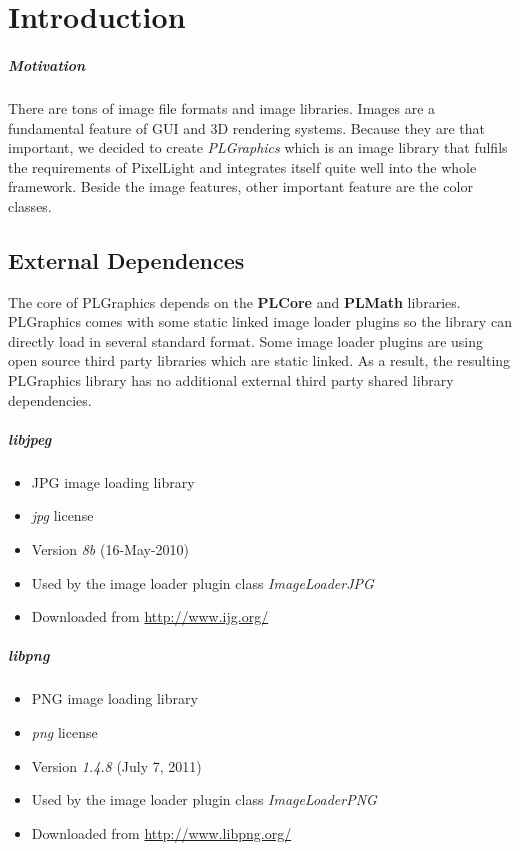 \chapter{Introduction}


\paragraph{Motivation}
There are tons of image file formats and image libraries. Images are a fundamental feature of GUI and 3D rendering systems. Because they are that important, we decided to create \emph{PLGraphics} which is an image library that fulfils the requirements of PixelLight and integrates itself quite well into the whole framework. Beside the image features, other important feature are the color classes.




\section{External Dependences}
The core of PLGraphics depends on the \textbf{PLCore} and \textbf{PLMath} libraries. PLGraphics comes with some static linked image loader plugins so the library can directly load in several standard format. Some image loader plugins are using open source third party libraries which are static linked. As a result, the resulting PLGraphics library has no additional external third party shared library dependencies.


\paragraph{libjpeg}
\begin{itemize}
\item JPG image loading library
\item \emph{jpg} license
\item Version \emph{8b} (16-May-2010)
\item Used by the image loader plugin class \emph{ImageLoaderJPG}
\item Downloaded from \url{http://www.ijg.org/}
\end{itemize}


\paragraph{libpng}
\begin{itemize}
\item PNG image loading library
\item \emph{png} license
\item Version \emph{1.4.8} (July 7, 2011)
\item Used by the image loader plugin class \emph{ImageLoaderPNG}
\item Downloaded from \url{http://www.libpng.org/}
\end{itemize}
